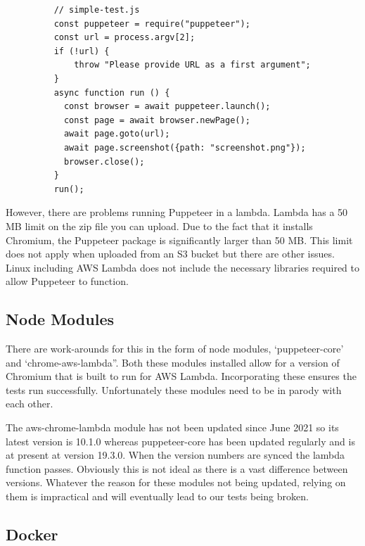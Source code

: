\documentclass[12pt,a4paper,titlepage]{report}
\begin{document}
\begin{figure}
  \begin{tcolorbox}
    \begin{verbatim}
    // simple-test.js
    const puppeteer = require("puppeteer");
    const url = process.argv[2];
    if (!url) {
        throw "Please provide URL as a first argument";
    }
    async function run () {
      const browser = await puppeteer.launch();
      const page = await browser.newPage();
      await page.goto(url);
      await page.screenshot({path: "screenshot.png"});
      browser.close();
    }
    run();
\end{verbatim}
\end{tcolorbox}
\end{figure}

However, there are problems running Puppeteer in a lambda. Lambda has a 50 MB limit on the zip file you can upload. Due to the fact that it installs Chromium, the Puppeteer package is significantly larger than 50 MB. This limit does not apply when uploaded from an S3 bucket but there are other issues. Linux including AWS Lambda does not include the necessary libraries required to allow Puppeteer to function.

\subsection{Node Modules}

There are work-arounds for this in the form of node modules, ‘puppeteer-core’ and ‘chrome-aws-lambda”.
Both these modules installed allow for a version of Chromium that is built to run for AWS Lambda. Incorporating
these ensures the tests run successfully. Unfortunately these modules need to be in parody with each other.

The aws-chrome-lambda module has not been updated since June 2021 so its latest version is 10.1.0 whereas
puppeteer-core has been updated regularly and is at present at version 19.3.0. When the version numbers are
synced the lambda function passes. Obviously this is not ideal as there is a vast difference between versions.
Whatever the reason for these modules not being updated, relying on them is impractical and will eventually lead to our tests being broken.

\subsection{Docker}
\end{document}
